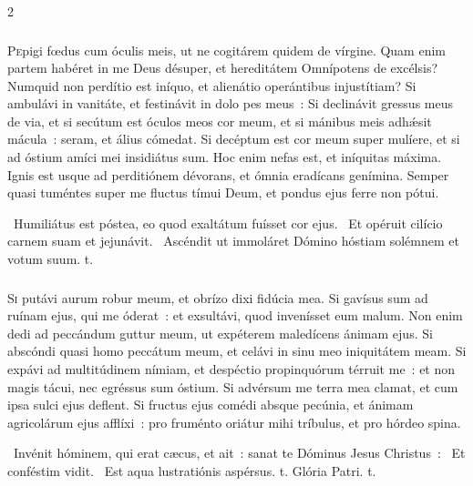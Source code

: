 \documentclass[9pt,twoside]{extarticle}
\begin{document}
\begin{multicols}{2}
{\subsubsection*{\center{}}
\lettrine{P}epigi fœdus cum óculis meis, ut ne cogitárem quidem de vírgine. Quam enim partem habéret in me Deus désuper, et hereditátem Omnípotens de excélsis? Numquid non perdítio est iníquo, et alienátio operántibus injustítiam? Si ambulávi in vanitáte, et festinávit in dolo pes meus~: Si declinávit gressus meus de via, et si secútum est óculos meos cor meum, et si mánibus meis adhǽsit mácula~: seram, et álius cómedat. Si decéptum est cor meum super mulíere, et si ad óstium amíci mei insidiátus sum. Hoc enim nefas est, et iníquitas máxima. Ignis est usque ad perditiónem dévorans, et ómnia eradícans genímina. Semper quasi tuméntes super me fluctus tímui Deum, et pondus ejus ferre non pótui. 

\begin{tightlist}{}
\item {}~Humiliátus est póstea, eo quod exaltátum fuísset cor ejus. \textred{*}~Et opéruit cilício carnem suam et jejunávit. ~Ascéndit ut immoláret Dómino hóstiam solémnem et votum suum. t.
\end{tightlist}

\subsubsection*{\center {}}
\lettrine{S}i putávi aurum robur meum, et obrízo dixi fidúcia mea. Si gavísus sum ad ruínam ejus, qui me óderat~: et exsultávi, quod invenísset eum malum. Non enim dedi ad peccándum guttur meum, ut expéterem maledícens ánimam ejus. Si abscóndi quasi homo peccátum meum, et celávi in sinu meo iniquitátem meam. Si expávi ad multitúdinem nímiam, et despéctio propinquórum térruit me~: et non magis tácui, nec egréssus sum óstium. Si advérsum me terra mea clamat, et cum ipsa sulci ejus deflent. Si fructus ejus comédi absque pecúnia, et ánimam agricolárum ejus afflíxi~: pro fruménto oriátur mihi tríbulus, et pro hórdeo spina. 

\begin{tightlist}{}
\item {}~Invénit hóminem, qui erat cæcus, et ait~: sanat te Dóminus Jesus Christus~: \textred{*}~Et conféstim vidit. ~Est aqua lustratiónis aspérsus. t. Glória Patri. t.
\end{tightlist}

}
\end{multicols}
\end{document}
